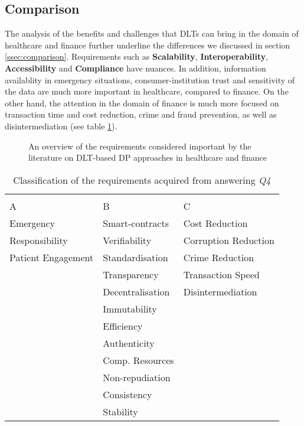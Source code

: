 \subsection{Comparison}
\label{ssec:cr-comparison}

The analysis of the benefits and challenges that DLTs can bring in the domain of healthcare and finance further underline the differences we discussed in section \ref{ssec:comparison}. Requirements such as \textbf{Scalability}, \textbf{Interoperability}, \textbf{Accessibility} and \textbf{Compliance} have nuances. In addition, information availablity in emergency situations, consumer-institution trust and sensitivity of the data are much more important in healthcare, compared to finance. On the other hand, the attention in the domain of finance is much more focused on transaction time and cost reduction, crime and fraud prevention, as well as disintermediation (see table \ref{tab:classucdp}).

\begin{figure}[H]
    \centering
    
    \caption{ An overview of the requirements considered important by the literature on DLT-based DP approaches in healthcare and finance}
    \label{fig:ucdp}
\end{figure}

\begin{table}[H]
    \centering
\caption{Classification of the requirements acquired from answering \textit{Q4}}
    \label{tab:classucdp}
\begin{tabular}{m{4cm} m{4cm} m{4cm}}
&&\\
\hspace{40pt}A & \hspace{40pt}B & \hspace{40pt}C \\ \hline
\rule{0pt}{3ex}Emergency & \rule{0pt}{3ex}Smart-contracts & \rule{0pt}{3ex}Cost Reduction \\ 
Responsibility & Verifiability & Corruption Reduction\\ 
Patient Engagement & Standardisation & Crime Reduction\\
                & Transparency & Transaction Speed\\
                & Decentralisation & Disintermediation\\
                & Immutability & \\
                & Efficiency & \\
                & Authenticity & \\
                & Comp. Resources & \\
                & Non-repudiation & \\
                & Consistency & \\
                & Stability & \\
\end{tabular}

\end{table}

